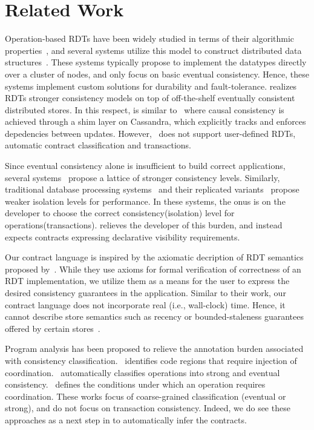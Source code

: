 \section{Related Work}
\label{sec:related}

Operation-based RDTs have been widely studied in terms of their algorithmic
properties~\cite{SSS,Burckhardt2014}, and several systems utilize this model to
construct distributed data structures~\cite{Cassandra,Bayou,Tango}. These
systems typically propose to implement the datatypes directly over a cluster of
nodes, and only focus on basic eventual consistency. Hence, these systems
implement custom solutions for durability and fault-tolerance. \name realizes
RDTs stronger consistency models on top of off-the-shelf eventually consistent
distributed stores. In this respect, \name is similar to~\cite{BoltOn} where
causal consistency is achieved through a shim layer on Cassandra, which
explicitly tracks and enforces depedencies between updates.
However,~\cite{BoltOn} does not support user-defined RDTs, automatic contract
classification and transactions.

Since eventual consistency alone is insufficient to build correct applications,
several systems~\cite{Bayou,Pileus,RedBlue} propose a lattice of stronger
consistency levels. Similarly, traditional database processing
systems~\cite{Berenson95} and their replicated variants~\cite{BailisHAT}
propose weaker isolation levels for performance. In these systems, the onus is
on the developer to choose the correct consistency(isolation) level for
operations(transactions). \name relieves the developer of this burden, and
instead expects contracts expressing declarative visibility requirements.

Our contract language is inspired by the axiomatic decription of RDT semantics
proposed by~\cite{Burckhardt2014}. While they use axioms for formal
verification of correctness of an RDT implementation, we utilize them as a
means for the user to express the desired consistency guarantees in the
application. Similar to their work, our contract language does not incorporate
real (i.e., wall-clock) time. Hence, it cannot describe store semantics such as
recency or bounded-staleness guarantees offered by certain
stores~\cite{Pileus}.

Program analysis has been proposed to relieve the annotation burden associated
with consistency classification.~\cite{Calm} identifies code regions that
require injection of coordination.~\cite{Sieve} automatically classifies
operations into strong and eventual consistency.~\cite{IConfluence} defines the
conditions under which an operation requires coordination. These works focus of
coarse-grained classification (eventual or strong), and do not focus on
transaction consistency. Indeed, we do see these approaches as a next step in
\name to automatically infer the contracts.
